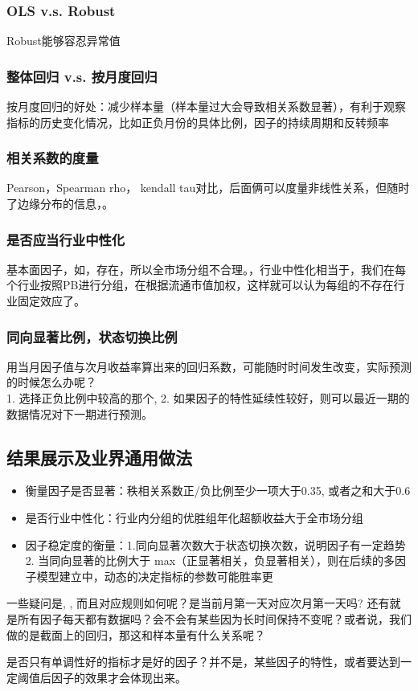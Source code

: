 \documentclass[12pt]{article}
\theoremstyle{definition}
\begin{document}
\subsubsection{OLS v.s. Robust}
Robust能够容忍异常值
\subsubsection{整体回归 v.s. 按月度回归}
按月度回归的好处：减少样本量（样本量过大会导致相关系数显著），有利于观察指标的历史变化情况，比如正负月份的具体比例，因子的持续周期和反转频率
\subsubsection{相关系数的度量}
Pearson，Spearman rho， kendall tau对比，后面俩可以度量非线性关系，但随时了边缘分布的信息，。

\subsubsection{是否应当行业中性化}
基本面因子，如，存在，所以全市场分组不合理。，行业中性化相当于，我们在每个行业按照PB进行分组，在根据流通市值加权，这样就可以认为每组的不存在行业固定效应了。
\subsubsection{同向显著比例，状态切换比例}
用当月因子值与次月收益率算出来的回归系数，可能随时时间发生改变，实际预测的时候怎么办呢？\\
1. 选择正负比例中较高的那个, 2. 如果因子的特性延续性较好，则可以最近一期的数据情况对下一期进行预测。

\subsection{结果展示及业界通用做法}
\begin{sconclude}{}{}
	\begin{itemize}
		\item 衡量因子是否显著：秩相关系数正/负比例至少一项大于0.35, 或者之和大于0.6
		\item 是否行业中性化：行业内分组的优胜组年化超额收益大于全市场分组
		\item 因子稳定度的衡量：1.同向显著次数大于状态切换次数，说明因子有一定趋势 2. 当同向显著的比例大于 max（正显著相关，负显著相关），则在后续的多因子模型建立中，动态的决定指标的参数可能胜率更

	\end{itemize}
\end{sconclude}
一些疑问是, , 而且对应规则如何呢？是当前月第一天对应次月第一天吗? 还有就是所有因子每天都有数据吗？会不会有某些因为长时间保持不变呢？或者说，我们做的是截面上的回归，那这和样本量有什么关系呢？\par
是否只有单调性好的指标才是好的因子？并不是，某些因子的特性，或者要达到一定阈值后因子的效果才会体现出来。
\end{document}
